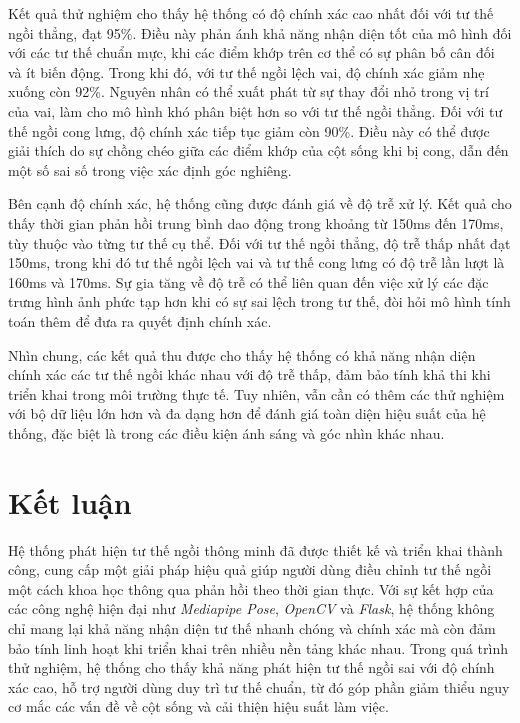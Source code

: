 \documentclass[conference]{IEEEtran}
\begin{document}
Kết quả thử nghiệm cho thấy hệ thống có độ chính xác cao nhất đối với tư thế ngồi thẳng, đạt 95\%. Điều này phản ánh khả năng nhận diện tốt của mô hình đối với các tư thế chuẩn mực, khi các điểm khớp trên cơ thể có sự phân bố cân đối và ít biến động. Trong khi đó, với tư thế ngồi lệch vai, độ chính xác giảm nhẹ xuống còn 92\%. Nguyên nhân có thể xuất phát từ sự thay đổi nhỏ trong vị trí của vai, làm cho mô hình khó phân biệt hơn so với tư thế ngồi thẳng. Đối với tư thế ngồi cong lưng, độ chính xác tiếp tục giảm còn 90\%. Điều này có thể được giải thích do sự chồng chéo giữa các điểm khớp của cột sống khi bị cong, dẫn đến một số sai số trong việc xác định góc nghiêng.

Bên cạnh độ chính xác, hệ thống cũng được đánh giá về độ trễ xử lý. Kết quả cho thấy thời gian phản hồi trung bình dao động trong khoảng từ 150ms đến 170ms, tùy thuộc vào từng tư thế cụ thể. Đối với tư thế ngồi thẳng, độ trễ thấp nhất đạt 150ms, trong khi đó tư thế ngồi lệch vai và tư thế cong lưng có độ trễ lần lượt là 160ms và 170ms. Sự gia tăng về độ trễ có thể liên quan đến việc xử lý các đặc trưng hình ảnh phức tạp hơn khi có sự sai lệch trong tư thế, đòi hỏi mô hình tính toán thêm để đưa ra quyết định chính xác.


Nhìn chung, các kết quả thu được cho thấy hệ thống có khả năng nhận diện chính xác các tư thế ngồi khác nhau với độ trễ thấp, đảm bảo tính khả thi khi triển khai trong môi trường thực tế. Tuy nhiên, vẫn cần có thêm các thử nghiệm với bộ dữ liệu lớn hơn và đa dạng hơn để đánh giá toàn diện hiệu suất của hệ thống, đặc biệt là trong các điều kiện ánh sáng và góc nhìn khác nhau.


\section{Kết luận}

Hệ thống phát hiện tư thế ngồi thông minh đã được thiết kế và triển khai thành công, cung cấp một giải pháp hiệu quả giúp người dùng điều chỉnh tư thế ngồi một cách khoa học thông qua phản hồi theo thời gian thực. Với sự kết hợp của các công nghệ hiện đại như \textit{Mediapipe Pose}, \textit{OpenCV} và \textit{Flask}, hệ thống không chỉ mang lại khả năng nhận diện tư thế nhanh chóng và chính xác mà còn đảm bảo tính linh hoạt khi triển khai trên nhiều nền tảng khác nhau. Trong quá trình thử nghiệm, hệ thống cho thấy khả năng phát hiện tư thế ngồi sai với độ chính xác cao, hỗ trợ người dùng duy trì tư thế chuẩn, từ đó góp phần giảm thiểu nguy cơ mắc các vấn đề về cột sống và cải thiện hiệu suất làm việc.
\end{document}
